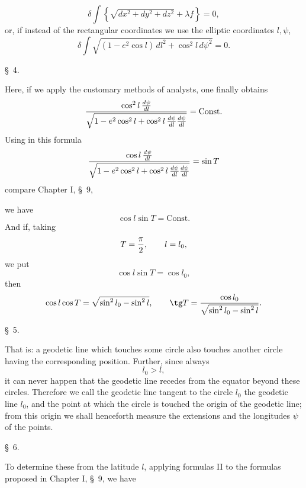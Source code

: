\[
 \delta\int\left\{\sqrt{dx^2+dy^2+dz^2}+\lambda f\right\}=0,
\]
or, if instead of the rectangular coordinates  we use the elliptic coordinates $l,\psi$,
\[
 \delta\int \sqrt{(1-e^2\cos l)\,dl^2+\cos^2l\,d\psi^2}=0.
\]

\begin{center}\S\ 4.\end{center}
Here, if we apply the customary methods of analysts, one finally obtains
\[
 {\cos^2l\,{d\psi\over dl}\over\sqrt{1-e^2\cos^2l+\cos^2l\,{d\psi\over dl}{d\psi\over dl}}}=\mathrm{Const}.
\]
Using in this formula
\[
 {\cos l\,{d\psi\over dl}\over\sqrt{1-e^2\cos^2l+\cos^2l\,{d\psi\over dl}{d\psi\over dl}}}=\sin T
\]
\hfill compare Chapter I, \S\ 9,

we have
\[
 \cos l\sin T=\mathrm{Const}.
\]
And if, taking
\[
 T={\pi\over 2},\qquad l=l_0,
\]
we put
\[
 \cos l\sin T=\cos l_0,
\]
then
\[
 \cos l\cos T=\sqrt{\sin^2l_0-\sin^2l},
\qquad
 \tg T={\cos l_0\over\sqrt{\sin^2l_0-\sin^2l}}.
\]

\begin{center}\S\ 5.\end{center}
That is: a geodetic line which touches some circle also touches another circle having the corresponding position. Further, since always
\[
 l_0>l,
\]
it can never happen that the geodetic line recedes from the equator beyond these circles. Therefore we call the geodetic line tangent to the circle $l_0$ the geodetic line $l_0$, and the point at which the circle is touched the origin of the geodetic line; from this origin we shall henceforth measure the extensions  and the longitudes $\psi$ of the points.

\begin{center}\S\ 6.\end{center}
To determine these from the latitude $l$, applying formulas II to the formulas proposed in Chapter I, \S\ 9, we have
